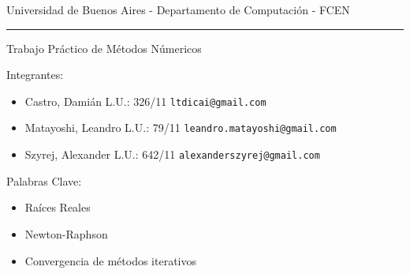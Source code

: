 \begin{center}
	Universidad de Buenos Aires - Departamento de Computaci\'on - FCEN
\end{center}

\rule{\linewidth}{0.5mm}

\vspace{1cm}

\begin{center}
	\Huge{Trabajo Práctico de Métodos Númericos}
\end{center}


\vspace{4cm}


Integrantes:
\begin{itemize}
	\item Castro, Dami\'an L.U.: 326/11  \verb+ltdicai@gmail.com+
	\item Matayoshi, Leandro L.U.: 79/11 \verb+leandro.matayoshi@gmail.com+
	\item Szyrej, Alexander L.U.: 642/11   \verb+alexanderszyrej@gmail.com+
	
\end{itemize}


\maketitle

\vspace{4cm}

Palabras Clave:
\begin{itemize}
	\item Ra\'ices Reales
	\item Newton-Raphson
	\item Convergencia de m\'etodos iterativos
\end{itemize}

